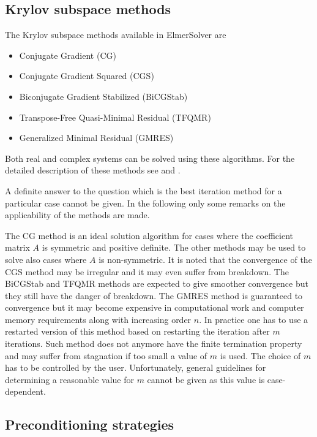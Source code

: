 \subsection{Krylov subspace methods}

The Krylov subspace methods available in ElmerSolver are
\begin{itemize}
\item Conjugate Gradient (CG)
\item Conjugate Gradient Squared (CGS) 
\item Biconjugate Gradient Stabilized (BiCGStab)
\item Transpose-Free Quasi-Minimal Residual (TFQMR)
\item Generalized Minimal Residual (GMRES)
\end{itemize}
Both real and complex systems can be solved using these algorithms. 
For the detailed description of these methods see \cite{Barrett93} 
and \cite{Freund93}.

A definite answer to the question which is the best iteration method for a particular
case cannot be given. 
In the following only some remarks on the applicability of the 
methods are made.
   
The CG method is an ideal solution algorithm for cases where the coefficient
matrix $A$ is symmetric and positive definite. The other methods may 
be used to solve also cases where $A$ is non-symmetric. It is noted that 
the convergence of the CGS method may be irregular and it may even suffer from breakdown. 
The BiCGStab and TFQMR methods are expected to give smoother convergence but they 
still have the danger of breakdown. The GMRES method is guaranteed to convergence
but it may become expensive in computational work and computer memory requirements
along with increasing order $n$.
In practice one has to use a restarted version of this method based on restarting 
the iteration after $m$ iterations. Such method does not anymore have the finite 
termination property and may suffer from stagnation
if too small a value of $m$ is used.
The choice of $m$ has to be controlled by the user. 
Unfortunately, general guidelines for determining a reasonable value for
$m$ cannot be given as this value is case-dependent.  


\subsection{Preconditioning strategies}

